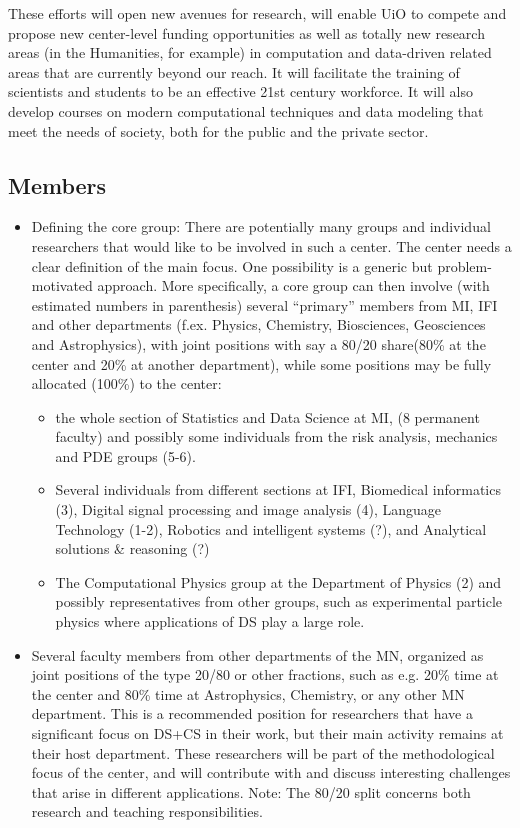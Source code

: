\documentclass[a4paper,10pt]{article}
\begin{document}
These efforts will open new avenues for research, will enable UiO to compete and propose new center-level funding opportunities as well as totally new research areas (in the Humanities, for example) in computation and data-driven related areas that are currently beyond our reach. It will facilitate the training of scientists and students to be an effective 21st century workforce. It will also develop courses on modern computational techniques and data modeling that meet the needs of society, both for the public and the private sector.





\subsection{Members}
\begin{itemize}
\item Defining the core group: There are potentially many groups and individual researchers that would like to be involved in such a center. The center needs a clear definition of the main focus. One possibility is a generic but problem-motivated approach. More specifically, a core group can then involve (with estimated numbers in parenthesis)
several “primary” members from MI, IFI and  other departments (f.ex. Physics, Chemistry, Biosciences, Geosciences and Astrophysics), with joint positions with say a 80/20 share(80\% at the center and 20\% at another department), while some positions may be fully allocated  (100\%) to the center:
\begin{itemize}
\item the whole section of Statistics and Data Science at MI, (8 permanent faculty) and possibly some individuals from the risk analysis, mechanics and PDE groups (5-6).
\item Several individuals from different sections at IFI, Biomedical informatics (3), Digital signal processing and image analysis (4), Language Technology (1-2), Robotics and intelligent systems (?), and Analytical solutions \& reasoning (?)
\item The Computational Physics group at the Department of Physics (2) and possibly representatives from other groups, such as experimental particle physics where applications of DS play a  large role.
\end{itemize}
\item Several faculty members from other  departments of the MN, organized as joint positions of the type 20/80 or other fractions, such as e.g. 20\% time at the center and 80\% time at Astrophysics, Chemistry, or any other MN department. This is a recommended position for researchers that have a significant  focus on DS+CS in their work, but their main activity remains  at their host department. These researchers will be part of the methodological focus of the center, and will contribute with and discuss interesting challenges that arise in different applications. Note: The 80/20 split concerns both research and teaching responsibilities. 
\end{itemize}
\end{document}
